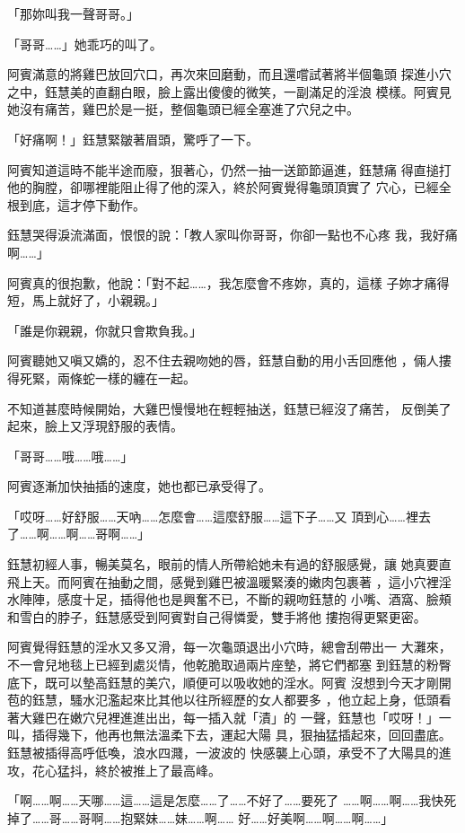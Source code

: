 「那妳叫我一聲哥哥。」

「哥哥……」她乖巧的叫了。

阿賓滿意的將雞巴放回穴口，再次來回磨動，而且還嚐試著將半個龜頭
探進小穴之中，鈺慧美的直翻白眼，臉上露出傻傻的微笑，一副滿足的淫浪
模樣。阿賓見她沒有痛苦，雞巴於是一挺，整個龜頭已經全塞進了穴兒之中。

「好痛啊！」鈺慧緊皺著眉頭，驚呼了一下。

阿賓知道這時不能半途而廢，狠著心，仍然一抽一送節節逼進，鈺慧痛
得直搥打他的胸膛，卻哪裡能阻止得了他的深入，終於阿賓覺得龜頭頂實了
穴心，已經全根到底，這才停下動作。

鈺慧哭得淚流滿面，恨恨的說：「教人家叫你哥哥，你卻一點也不心疼
我，我好痛啊……」

阿賓真的很抱歉，他說：「對不起……，我怎麼會不疼妳，真的，這樣
子妳才痛得短，馬上就好了，小親親。」

「誰是你親親，你就只會欺負我。」

阿賓聽她又嗔又嬌的，忍不住去親吻她的唇，鈺慧自動的用小舌回應他
，倆人摟得死緊，兩條蛇一樣的纏在一起。

不知道甚麼時候開始，大雞巴慢慢地在輕輕抽送，鈺慧已經沒了痛苦，
反倒美了起來，臉上又浮現舒服的表情。

「哥哥……哦……哦……」

阿賓逐漸加快抽插的速度，她也都已承受得了。

「哎呀……好舒服……天吶……怎麼會……這麼舒服……這下子……又
頂到心……裡去了……啊……啊……哥啊……」

鈺慧初經人事，暢美莫名，眼前的情人所帶給她未有過的舒服感覺，讓
她真要直飛上天。而阿賓在抽動之間，感覺到雞巴被溫暖緊湊的嫩肉包裹著
，這小穴裡淫水陣陣，感度十足，插得他也是興奮不已，不斷的親吻鈺慧的
小嘴、酒窩、臉頰和雪白的脖子，鈺慧感受到阿賓對自己得憐愛，雙手將他
摟抱得更緊更密。

阿賓覺得鈺慧的淫水又多又滑，每一次龜頭退出小穴時，總會刮帶出一
大灘來，不一會兒地毯上已經到處災情，他乾脆取過兩片座墊，將它們都塞
到鈺慧的粉臀底下，既可以墊高鈺慧的美穴，順便可以吸收她的淫水。阿賓
沒想到今天才剛開苞的鈺慧，騷水氾濫起來比其他以往所經歷的女人都要多
，他立起上身，低頭看著大雞巴在嫩穴兒裡進進出出，每一插入就「漬」的
一聲，鈺慧也「哎呀！」一叫，插得幾下，他再也無法溫柔下去，運起大陽
具，狠抽猛插起來，回回盡底。鈺慧被插得高呼低喚，浪水四濺，一波波的
快感襲上心頭，承受不了大陽具的進攻，花心猛抖，終於被推上了最高峰。

「啊……啊……天哪……這……這是怎麼……了……不好了……要死了
……啊……啊……我快死掉了……哥……哥啊……抱緊妹……妹……啊……
好……好美啊……啊……啊……」

